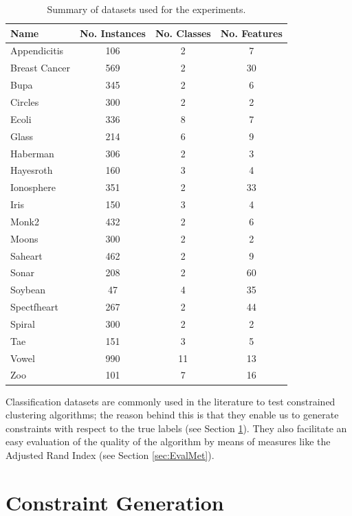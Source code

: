 \begin{table}[!h]
	\centering
	\small
	\begin{tabular}{l c c c}
		\hline
		Name & No. Instances & No. Classes & No. Features \\
		\hline
		Appendicitis & 106 & 2 & 7 \\
		Breast Cancer & 569 & 2 & 30 \\
		Bupa & 345 & 2 & 6 \\
		Circles & 300 & 2 & 2 \\
		Ecoli & 336 & 8 & 7 \\
		Glass & 214 & 6 & 9 \\
		Haberman & 306 & 2 & 3 \\
		Hayesroth & 160 & 3 & 4 \\
		Ionosphere & 351 & 2 & 33 \\
		Iris & 150 & 3 & 4 \\
		Monk2 & 432 & 2 & 6 \\
		Moons & 300 & 2 & 2 \\
		Saheart & 462 & 2 & 9 \\
		Sonar & 208 & 2 & 60 \\
		Soybean & 47 & 4 & 35 \\
		Spectfheart & 267 & 2 & 44 \\
		Spiral & 300 & 2 & 2 \\
		Tae & 151 & 3 & 5 \\
		Vowel & 990 & 11 & 13 \\
		Zoo & 101 & 7 & 16 \\
		\hline
		
	\end{tabular}%
	\caption{Summary of datasets used for the experiments.}
	\label{tab:datasets}
\end{table}

Classification datasets are commonly used in the literature to test constrained clustering algorithms; the reason behind this is that they enable us to generate constraints with respect to the true labels (see Section \ref{sec:ConstGen}). They also facilitate an easy evaluation of the quality of the algorithm by means of measures like the Adjusted Rand Index (see Section \ref{sec:EvalMet}).

\section{Constraint Generation} \label{sec:ConstGen}

